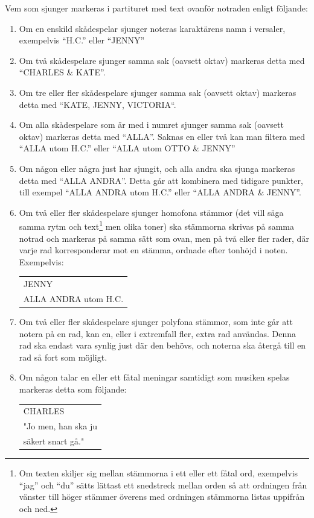 Vem som sjunger markeras i partituret med text ovanför notraden enligt följande:
\begin{enumerate}
    \item Om en enskild skådespelar sjunger noteras karaktärens namn i versaler, exempelvis ``H.C.'' eller ``JENNY''
    \item Om två skådespelare sjunger samma sak (oavsett oktav) markeras detta med ``CHARLES \& KATE''.
    \item Om tre eller fler skådespelare sjunger samma sak (oavsett oktav) markeras detta med ``KATE, JENNY, VICTORIA``.
    \item Om alla skådespelare som är med i numret sjunger samma sak (oavsett oktav) markeras detta med ``ALLA''. Saknas en eller två kan man filtera med ``ALLA utom H.C.'' eller ``ALLA utom OTTO \& JENNY''
    \item Om någon eller några just har sjungit, och alla andra ska sjunga markeras detta med ``ALLA ANDRA''. Detta går att kombinera med tidigare punkter, till exempel ``ALLA ANDRA utom H.C.'' eller ``ALLA ANDRA \& JENNY''.
    \item Om två eller fler skådespelare sjunger homofona stämmor (det vill säga samma rytm och text\footnote{Om texten skiljer sig mellan stämmorna i ett eller ett fåtal ord, exempelvis ``jag'' och ``du'' sätts lättast ett snedstreck mellan orden så att ordningen från vänster till höger stämmer överens med ordningen stämmorna listas uppifrån och ned.} men olika toner) ska stämmorna skrivas på samma notrad och markeras på samma sätt som ovan, men på två eller fler rader, där varje rad korresponderar mot en stämma, ordnade efter tonhöjd i noten. Exempelvis:
\begin{center}
    \begin{tabular}{l}
JENNY \\
ALLA ANDRA utom H.C.
\end{tabular}
\end{center}

    \item Om två eller fler skådespelare sjunger polyfona stämmor, som inte går att notera på en rad, kan en, eller i extremfall fler, extra rad användas. Denna rad ska endast vara synlig just där den behövs, och noterna ska återgå till en rad så fort som möjligt. 

\item Om någon talar en eller ett fåtal meningar samtidigt som musiken spelas markeras detta som följande: 
\begin{center}
    \begin{tabular}{l}
CHARLES \\
"Jo men, han ska ju \\
säkert snart gå."
\end{tabular}
\end{center}
\end{enumerate}

